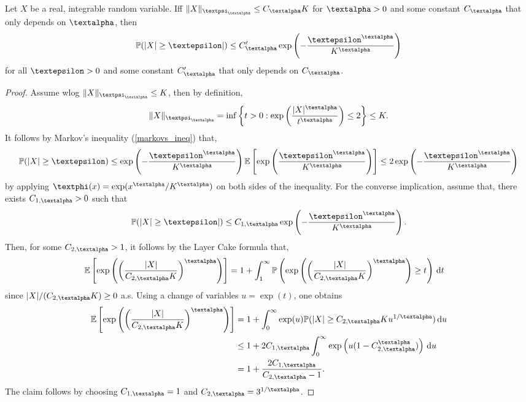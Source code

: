 \documentclass[openany]{book}
\begin{document}
\begin{lemma}\label{orlicz-norm-tail}
Let $X$ be a real, integrable random variable. Iff $\|X\|_{\gpsi_{\galpha}}\leq C_{\galpha} K$ for $\galpha>0$ and some constant $C_{\galpha}$ that only depends on $\galpha$, then
\begin{equation*}
    \mathbb P( \vert X\vert  \geq \gepsilon\vert )\leq C_{\galpha}'\exp\left(-\frac{\gepsilon^{\galpha}}{K^{\galpha}}\right)
\end{equation*}
for all $\gepsilon>0$ and some constant $C_{\galpha}'$ that only depends on $C_{\galpha}$.
\begin{proof}
    Assume wlog $\|X\|_{\gpsi_{\galpha}}\leq K$, then by definition,
    \begin{equation*}
        \|X\|_{\gpsi_{\galpha}}=\inf\left\{t>0:\exp\left(\frac{\vert X\vert ^{\galpha}}{t^{\galpha}}\right)\leq 2\right\}\leq K.
    \end{equation*}
    It follows by Markov's inequality (\ref{markovs_ineq}) that,
    \begin{equation*}
        \mathbb P(\vert X\vert \geq \gepsilon)\leq \exp\left(-\frac{\gepsilon^{\galpha}}{K^{\galpha}}\right)\mathbb E\left[\exp\left(\frac{\gepsilon^{\galpha}}{K^{\galpha}}\right)\right]\leq 2\exp\left(-\frac{\gepsilon^{\galpha}}{K^{\galpha}}\right)
    \end{equation*}
    by applying $\gphi(x)=\exp(x^{\galpha}/K^{\galpha})$ on both sides of the inequality.
    For the converse implication, assume that, there exists $C_{1,\galpha}>0$ such that
    \begin{equation*}
        \mathbb P( \vert X\vert  \geq \gepsilon\vert )\leq C_{1,\galpha}\exp\left(-\frac{\gepsilon^{\galpha}}{K^{\galpha}}\right).
    \end{equation*}
    Then, for some $C_{2,\galpha}>1$, it follows by the Layer Cake formula that,
    \begin{equation*}
    \begin{split}
        \mathbb E\left[\exp\left(\left(\frac{\vert X\vert}{C_{2,\galpha}K}\right)^{\galpha} \right)\right]&=1 +\int_{1}^\infty \mathbb P\left(\exp\left(\left(\frac{\vert X\vert}{C_{2,\galpha}K}\right)^{\galpha} \right) \geq t\right)\,\mathrm dt
    \end{split}
    \end{equation*}
    since $\vert X\vert/({C_{2,\galpha}K})\geq 0$ a.s. Using a change of variables $u=\exp(t)$, one obtains
    \begin{equation*}
    \begin{split}
        \mathbb E\left[\exp\left(\left(\frac{\vert X\vert}{C_{2,\galpha}K}\right)^{\galpha} \right)\right]&=1+\int_0^\infty \exp(u)\mathbb P(\vert X\vert \geq C_{2,\galpha} Ku^{1/\galpha})\,\mathrm du \\&\leq 1 + 2C_{1,\galpha}\int_0^\infty\exp\left(u(1-C_{2,\galpha}^{\galpha})\right)\,\mathrm du \\
        &=1+\frac{2C_{1,\galpha}}{C_{2,\galpha} - 1}.
    \end{split}
    \end{equation*}
    The claim follows by choosing $C_{1,\galpha}=1$ and $C_{2,\galpha}=3^{1/\galpha}$.
\end{proof}
\end{lemma}
\end{document}
